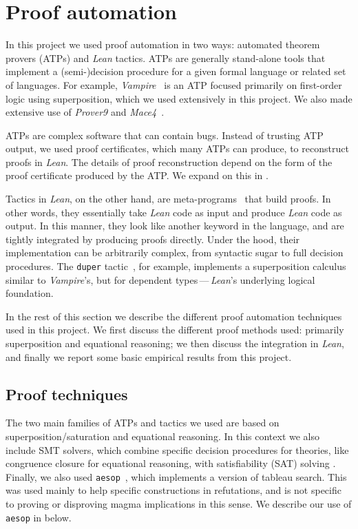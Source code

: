 \section{Proof automation}\label{automated-sec}

In this project we used proof automation in two ways: automated theorem provers (ATPs) and \emph{Lean} tactics.
ATPs are generally stand-alone tools that implement a (semi-)decision procedure for a given formal language or related set of languages.
For example, \emph{Vampire}~\cite{DBLP:conf/cav/KovacsV13,TheVampireDiary} is an ATP focused primarily on first-order logic using superposition, which we used extensively in this project.  We also made extensive use of \emph{Prover9} and \emph{Mace4}~\cite{prover9-mace4}.

ATPs are complex software that can contain bugs.
Instead of trusting ATP output, we used proof certificates, which many ATPs can produce, to reconstruct proofs in \emph{Lean}.
The details of proof reconstruction depend on the form of the proof certificate produced by the ATP\@.
We expand on this in .

Tactics in \emph{Lean}, on the other hand, are meta-programs~\cite{DBLP:journals/pacmpl/EbnerURAM17} that build proofs.
In other words, they essentially take \emph{Lean} code as input and produce \emph{Lean} code as output.
In this manner, they look like another keyword in the language, and are tightly integrated by producing proofs directly.
Under the hood, their implementation can be arbitrarily complex, from syntactic sugar to full decision procedures.
The \texttt{duper} tactic~\cite{DBLP:conf/itp/CluneQBA24}, for example, implements a superposition calculus similar to \emph{Vampire}'s, but for dependent types\,---\,\emph{Lean}'s underlying logical foundation.

In the rest of this section we describe the different proof automation techniques used in this project.
We first discuss the different proof methods used: primarily superposition and equational reasoning; we then discuss the integration in \emph{Lean}, and finally we report some basic empirical results from this project.

\subsection{Proof techniques}

The two main families of ATPs and tactics we used are based on superposition/saturation and equational reasoning.
In this context we also include SMT solvers, which combine specific decision procedures for theories, like congruence closure for equational reasoning, with satisfiability (SAT) solving \cite{deMoura-Bjorner-2009}.
Finally, we also used \texttt{aesop}~\cite{DBLP:conf/cpp/LimpergF23}, which implements a version of tableau search.
This was used mainly to help specific constructions in refutations, and is not specific to proving or disproving magma implications in this sense.
We describe our use of \texttt{aesop} in  below.

